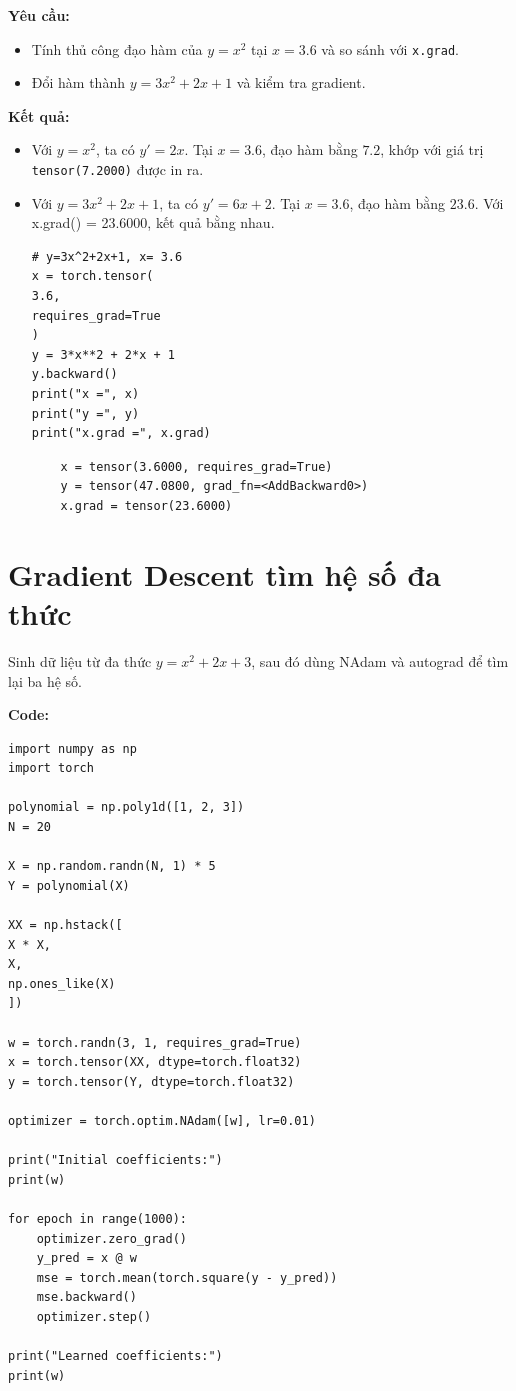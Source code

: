 \documentclass[12pt,a4paper]{article}
\begin{document}
\textbf{Yêu cầu:}
\begin{itemize}
    \item Tính thủ công đạo hàm của $y=x^2$ tại $x=3.6$ và so sánh với \texttt{x.grad}.
    \item Đổi hàm thành $y=3x^2+2x+1$ và kiểm tra gradient.
\end{itemize}

\textbf{Kết quả:}
\begin{itemize}
    \item Với $y=x^2$, ta có $y'=2x$. Tại $x=3.6$, đạo hàm bằng $7.2$, khớp với giá trị \texttt{tensor(7.2000)} được in ra.
    \item Với $y=3x^2+2x+1$, ta có $y'=6x+2$. Tại $x=3.6$, đạo hàm bằng $23.6$. Với x.grad() = 23.6000, kết quả bằng nhau.

\begin{verbatim}
# y=3x^2+2x+1, x= 3.6
x = torch.tensor(
3.6,
requires_grad=True
)
y = 3*x**2 + 2*x + 1
y.backward()
print("x =", x)
print("y =", y)
print("x.grad =", x.grad)
\end{verbatim}

    \begin{verbatim}
    x = tensor(3.6000, requires_grad=True)
    y = tensor(47.0800, grad_fn=<AddBackward0>)
    x.grad = tensor(23.6000)
    \end{verbatim}
\end{itemize}


\section{Gradient Descent tìm hệ số đa thức}
Sinh dữ liệu từ đa thức $y=x^2+2x+3$, sau đó dùng NAdam và autograd để tìm lại ba hệ số.

\textbf{Code:}
\begin{verbatim}
import numpy as np
import torch

polynomial = np.poly1d([1, 2, 3])
N = 20

X = np.random.randn(N, 1) * 5
Y = polynomial(X)

XX = np.hstack([
X * X,
X,
np.ones_like(X)
])

w = torch.randn(3, 1, requires_grad=True)
x = torch.tensor(XX, dtype=torch.float32)
y = torch.tensor(Y, dtype=torch.float32)

optimizer = torch.optim.NAdam([w], lr=0.01)

print("Initial coefficients:")
print(w)

for epoch in range(1000):
    optimizer.zero_grad()
    y_pred = x @ w
    mse = torch.mean(torch.square(y - y_pred))
    mse.backward()
    optimizer.step()

print("Learned coefficients:")
print(w)
\end{verbatim}
\end{document}
